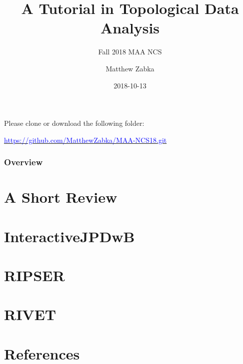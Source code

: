 \documentclass[handout]{beamer}
\title{A Tutorial in Topological Data Analysis} %
\subtitle{Fall 2018 MAA NCS}
\author{Matthew Zabka}
\institute[SMSU]{Mathematics and Computer Science \\ Southwest Minnesota State University} %
{
}
\date{2018-10-13} %
\begin{document}
\begin{frame}
\titlepage %
\begin{center}
Please clone or download the following folder:
\end{center}
\begin{center}
\hyperref[https://github.com/MatthewZabka/MAA-NCS18.git]{\textcolor{blue}{https://github.com/MatthewZabka/MAA-NCS18.git}}
\end{center}
\end{frame}
\begin{frame}
\frametitle{Overview} %
\tableofcontents 
\end{frame}
\section{A Short Review}

\section{InteractiveJPDwB}

\section{RIPSER}

\section{RIVET}

\section{References}
\begin{frame}


\end{frame}
\end{document}
